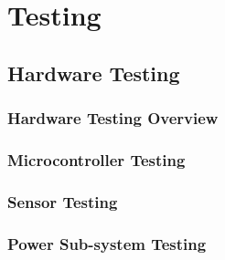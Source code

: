 \section{Testing}

\subsection{Hardware Testing}
    \subsubsection{Hardware Testing Overview}
    \subsubsection{Microcontroller Testing}
    \subsubsection{Sensor Testing}
    \subsubsection{Power Sub-system Testing}

